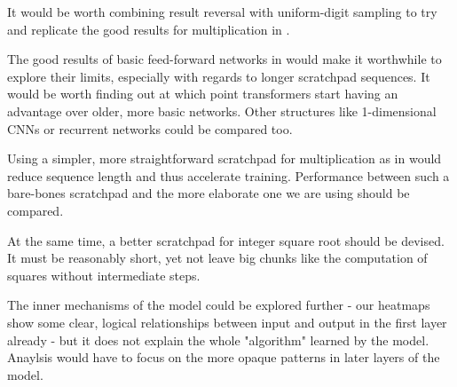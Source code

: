 It would be worth combining result reversal with uniform-digit sampling to try and replicate the good  results for multiplication in \cite{positionmatters}.

The good results of basic feed-forward networks in \cite{visual} would make it worthwhile to explore their limits, especially with regards to longer scratchpad sequences. It would be worth finding out at which point transformers start having an advantage over older, more basic networks. Other structures like 1-dimensional CNNs or recurrent networks could be compared too.

Using a simpler, more straightforward scratchpad for multiplication as in \cite{implicit} would reduce sequence length and thus accelerate training. Performance between such a bare-bones scratchpad and the more elaborate one we are using should be compared.

At the same time, a better scratchpad for integer square root should be devised. It must be reasonably short, yet not leave big chunks like the computation of squares without intermediate steps.

The inner mechanisms of the model could be explored further - our heatmaps show some clear, logical relationships between input and output in the first layer already - but it does not explain the whole "algorithm" learned by the model. Anaylsis would have to focus on the more opaque patterns in later layers of the model.